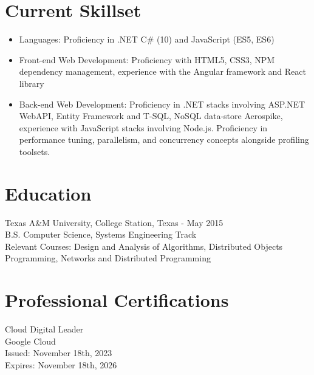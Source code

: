 \documentclass[11pt]{res} %
\begin{document}
\begin{resume}
\section{Current Skillset} 
 
   \begin{itemize} \itemsep -2pt  %
   \item Languages: Proficiency in .NET C\# (10) and JavaScript (ES5, ES6)
\\
   \item Front-end Web Development: Proficiency with HTML5, CSS3, NPM dependency management, experience with the Angular framework and React library
\\
    \item Back-end Web Development: Proficiency in .NET stacks involving ASP.NET WebAPI, Entity Framework and T-SQL, NoSQL data-store Aerospike, experience with JavaScript stacks involving Node.js. Proficiency in performance tuning, parallelism, and concurrency concepts alongside profiling toolsets.
 \end{itemize}
 
\section{Education} 
 \noindent Texas A\&M University, College Station, Texas - May 2015 \\
B.S. Computer Science, Systems Engineering Track \\
Relevant Courses: Design and Analysis of Algorithms, Distributed Objects Programming, Networks and Distributed Programming
 
\section{Professional Certifications} 
 \noindent Cloud Digital Leader \\
Google Cloud \\
Issued: November 18th, 2023 \\
Expires: November 18th, 2026

\end{resume}
\end{document}
